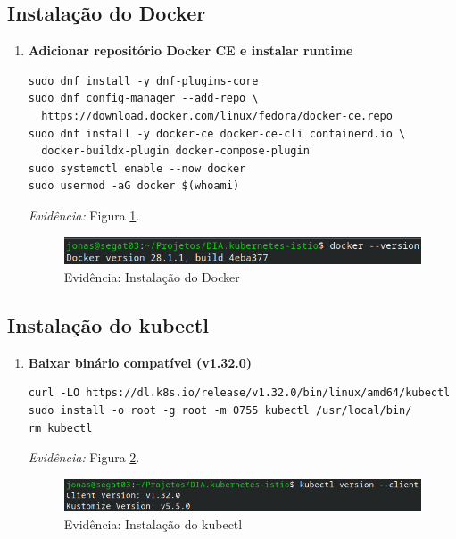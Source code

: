 \documentclass[12pt,a4paper]{report}
\begin{document}
\subsection{Instalação do Docker}
\begin{enumerate}
    \item\textbf{Adicionar repositório Docker CE e instalar runtime}

\begin{lstlisting}[style=shell]
sudo dnf install -y dnf-plugins-core
sudo dnf config-manager --add-repo \
  https://download.docker.com/linux/fedora/docker-ce.repo
sudo dnf install -y docker-ce docker-ce-cli containerd.io \
  docker-buildx-plugin docker-compose-plugin
sudo systemctl enable --now docker
sudo usermod -aG docker $(whoami)
\end{lstlisting}
\textit{Evidência:} Figura \ref{fig:docker}.\\

\begin{figure}[h]
    \centering
    \includegraphics[width=1\linewidth]{figures/evidence-docker}
    \caption{Evidência: Instalação do Docker}
    \label{fig:docker}
\end{figure}
\end{enumerate}

\subsection{Instalação do kubectl}
\begin{enumerate}
\item\textbf{Baixar binário compatível (v1.32.0)} \cite{kubernetes}

\begin{lstlisting}[style=shell]
curl -LO https://dl.k8s.io/release/v1.32.0/bin/linux/amd64/kubectl
sudo install -o root -g root -m 0755 kubectl /usr/local/bin/
rm kubectl
\end{lstlisting}
\textit{Evidência:} Figura \ref{fig:kubectl}.\\

\begin{figure}[h]
    \centering
    \includegraphics[width=1\linewidth]{figures/evidence-kubectl.png}
    \caption{Evidência: Instalação do kubectl}
    \label{fig:kubectl}
\end{figure}
\end{enumerate}
\end{document}
